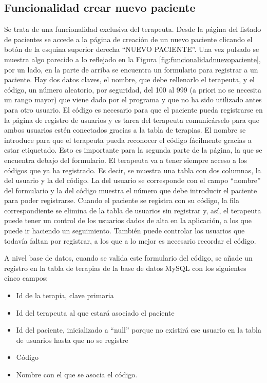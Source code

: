 \subsection{Funcionalidad crear nuevo paciente}

Se trata de una funcionalidad exclusiva del terapeuta. Desde la página del listado de pacientes se accede a la página de creación de un nuevo paciente clicando el botón de la esquina superior derecha ``NUEVO PACIENTE''. Una vez pulsado se muestra algo parecido a lo reflejado en la Figura \ref{fig:funcionalidadnuevopaciente}, por un lado, en la parte de arriba se encuentra un formulario para registrar a un paciente. Hay dos datos claves, el nombre, que debe rellenarlo el terapeuta, y el código, un número aleatorio, por seguridad, del 100 al 999 (a priori no se necesita un rango mayor) que viene dado por el programa y que no ha sido utilizado antes para otro usuario. El código es necesario para que el paciente pueda registrarse en la página de registro de usuarios y es tarea del terapeuta comunicárselo para que ambos usuarios estén conectados gracias a la tabla de terapias. El nombre se introduce para que el terapeuta pueda reconocer el código fácilmente gracias a estar etiquetado. Esto es importante para la segunda parte de la página, la que se encuentra debajo del formulario. El terapeuta va a tener siempre acceso a los códigos que ya ha registrado. Es decir, se muestra una tabla con dos columnas, la del usuario y la del código. La del usuario se corresponde con el campo ``nombre'' del formulario y la del código muestra el número que debe introducir el paciente para poder registrarse. Cuando el paciente se registra con su código, la fila correspondiente se elimina de la tabla de usuarios sin registrar y, así, el terapeuta puede tener un control de los usuarios dados de alta en la aplicación, a los que puede ir haciendo un seguimiento. También puede controlar los usuarios que todavía faltan por registrar, a los que a lo mejor es necesario recordar el código. 

A nivel base de datos, cuando se valida este formulario del código, se añade un registro en la tabla de terapias de la base de datos MySQL con los siguientes cinco campos: 
\begin{itemize}
	\item Id de la terapia, clave primaria
	\item Id del terapeuta al que estará asociado el paciente
	\item Id del paciente, inicializado a ``null'' porque no existirá ese usuario en la tabla de usuarios hasta que no se registre
	\item Código
	\item Nombre con el que se asocia el código.
\end{itemize}

